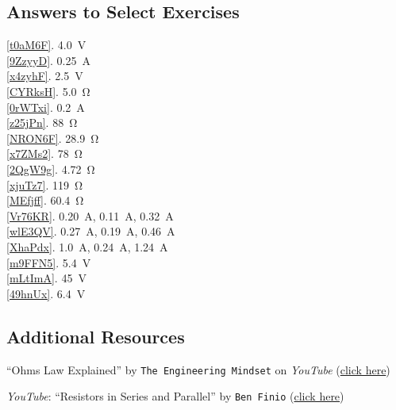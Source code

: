 \documentclass[dvipsnames]{article}
\numberwithin{equation}{section}
\numberwithin{figure}{section}
\begin{document}
\clearpage
\subsection*{Answers to Select Exercises}

\ref{t0aM6F}. \SI{4.0}{V}\\
\ref{9ZzyyD}. \SI{0.25}{A}\\
\ref{x4zyhF}. \SI{2.5}{V}\\
\ref{CYRksH}. \SI{5.0}{\ohm}\\
\ref{0rWTxi}. \SI{0.2}{A}\\
\ref{z25jPn}. \SI{88}{\ohm}\\
\ref{NRON6F}. \SI{28.9}{\ohm}\\
\ref{x7ZMs2}. \SI{78}{\ohm}\\
\ref{2QgW9g}. \SI{4.72}{\ohm}\\
\ref{xjuTz7}. \SI{119}{\ohm}\\
\ref{MEfjff}. \SI{60.4}{\ohm}\\
\ref{Vr76KR}. \SI{0.20}{A}, \SI{0.11}{A}, \SI{0.32}{A}\\ 
\ref{wlE3QV}. \SI{0.27}{A}, \SI{0.19}{A}, \SI{0.46}{A}\\ 
\ref{XhaPdx}. \SI{1.0}{A}, \SI{0.24}{A}, \SI{1.24}{A}\\ 
\ref{m9FFN5}. \SI{5.4}{V}\\
\ref{mLtImA}. \SI{45}{V}\\
\ref{49hnUx}. \SI{6.4}{V}\\


\subsection*{Additional Resources}

``Ohms Law Explained'' by \texttt{The Engineering Mindset} on \textit{YouTube} (\href{https://youtu.be/HsLLq6Rm5tU}{click here})

\textit{YouTube}: ``Resistors in Series and Parallel'' by \texttt{Ben Finio} 
(\href{https://youtu.be/bTnQUZ4Hi-E}{click here})

\clearpage
\printnoidxglossaries
\end{document}
